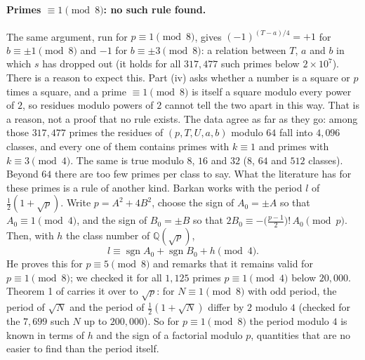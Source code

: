 \paragraph{Primes $\equiv1\pmod8$: no such rule found.} The same argument, run for $p\equiv1\pmod8$,
gives $(-1)^{(T-a)/4}=+1$ for $b\equiv\pm1\pmod8$ and $-1$ for $b\equiv\pm3\pmod8$: a relation between
$T$, $a$ and $b$ in which $s$ has dropped out (it holds for all $317{,}477$ such primes below
$2\times10^{7}$). There is a reason to expect this. Part (iv) asks whether a number is a square or $p$
times a square, and a prime $\equiv1\pmod8$ is itself a square modulo every power of $2$, so residues
modulo powers of $2$ cannot tell the two apart in this way. That is a reason, not a proof that no rule
exists. The data agree as far as they go: among those $317{,}477$ primes the residues of $(p,T,U,a,b)$
modulo $64$ fall into $4{,}096$ classes, and every one of them contains primes with $k\equiv1$ and
primes with $k\equiv3\pmod4$. The same is true modulo $8$, $16$ and $32$ ($8$, $64$ and $512$ classes).
Beyond $64$ there are too few primes per class to say. What the literature has for these primes is a rule of another kind. Barkan \citep{Barkan1975} works
with the period $l$ of $\tfrac12(1+\sqrt p)$. Write $p=A^{2}+4B^{2}$, choose the sign of $A_0=\pm A$ so
that $A_0\equiv1\pmod4$, and the sign of $B_0=\pm B$ so that
$2B_0\equiv-\bigl(\tfrac{p-1}{2}\bigr)!\,A_0\pmod p$. Then, with $h$ the class number of
$\mathbb{Q}(\sqrt p)$,
\[
  l\equiv\operatorname{sgn}A_0+\operatorname{sgn}B_0+h\pmod4 .
\]
He proves this for $p\equiv5\pmod8$ and remarks that it remains valid for $p\equiv1\pmod8$; we checked
it for all $1{,}125$ primes $p\equiv1\pmod4$ below $20{,}000$. Theorem 1 of \citep{KaplanWilliams1986} carries it over
to $\sqrt p$: for $N\equiv1\pmod8$ with odd period, the period of $\sqrt N$ and the period of
$\tfrac12(1+\sqrt N)$ differ by $2$ modulo $4$ (checked for the $7{,}699$ such $N$ up to $200{,}000$).
So for $p\equiv1\pmod8$ the period modulo $4$ is known in terms of $h$ and the sign of a factorial
modulo $p$, quantities that are no easier to find than the period itself.

